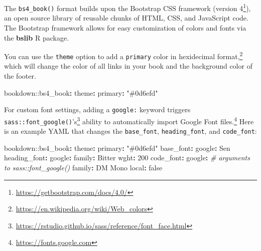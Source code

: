 \documentclass[
  12pt,
]{krantz}
\newenvironment{Shaded}{\begin{snugshade}}{\end{snugshade}}
\newcommand{\AttributeTok}[1]{\textcolor[rgb]{0.77,0.63,0.00}{#1}}
\newcommand{\CharTok}[1]{\textcolor[rgb]{0.31,0.60,0.02}{#1}}
\newcommand{\CommentTok}[1]{\textcolor[rgb]{0.56,0.35,0.01}{\textit{#1}}}
\newcommand{\DecValTok}[1]{\textcolor[rgb]{0.00,0.00,0.81}{#1}}
\newcommand{\FunctionTok}[1]{\textcolor[rgb]{0.00,0.00,0.00}{#1}}
\newcommand{\KeywordTok}[1]{\textcolor[rgb]{0.13,0.29,0.53}{\textbf{#1}}}
\newcommand{\StringTok}[1]{\textcolor[rgb]{0.31,0.60,0.02}{#1}}
\renewcommand{\href}[2]{#2\footnote{\url{#1}}}
\theoremstyle{definition}
\theoremstyle{definition}
\theoremstyle{definition}
\theoremstyle{definition}
\theoremstyle{remark}
\begin{document}
The \texttt{bs4\_book()} format builds upon the Bootstrap CSS framework (\href{https://getbootstrap.com/docs/4.0/}{version 4}), an open source library of reusable chunks of HTML, CSS, and JavaScript code. The Bootstrap framework allows for easy customization of colors and fonts via the \textbf{bslib} R package.

You can use the \texttt{theme} option to add a \texttt{primary} color in \href{https://en.wikipedia.org/wiki/Web_colors}{hexidecimal format,} which will change the color of all links in your book and the background color of the footer.

\begin{Shaded}
\begin{Highlighting}[]
\AttributeTok{bookdown:}\FunctionTok{:bs4\_book}\KeywordTok{:}
\AttributeTok{  }\FunctionTok{theme}\KeywordTok{:}
\AttributeTok{    }\FunctionTok{primary}\KeywordTok{:}\AttributeTok{ }\StringTok{"\#0d6efd"}\AttributeTok{   }
\end{Highlighting}
\end{Shaded}

For custom font settings, adding a \texttt{google:} keyword triggers \href{https://rstudio.github.io/sass/reference/font_face.html}{\texttt{sass::font\_google()}'s} ability to automatically import \href{https://fonts.google.com}{Google Font files.} Here is an example YAML that changes the \texttt{base\_font}, \texttt{heading\_font}, and \texttt{code\_font}:

\begin{Shaded}
\begin{Highlighting}[]
\AttributeTok{bookdown:}\FunctionTok{:bs4\_book}\KeywordTok{:}
\AttributeTok{  }\FunctionTok{theme}\KeywordTok{:}
\AttributeTok{    }\FunctionTok{primary}\KeywordTok{:}\AttributeTok{ }\StringTok{"\#0d6efd"}\AttributeTok{   }
\AttributeTok{    }\FunctionTok{base\_font}\KeywordTok{:}\AttributeTok{ }
\AttributeTok{      }\FunctionTok{google}\KeywordTok{:}\AttributeTok{ Sen}
\AttributeTok{    }\FunctionTok{heading\_font}\KeywordTok{:}
\AttributeTok{      }\FunctionTok{google}\KeywordTok{:}
\AttributeTok{        }\FunctionTok{family}\KeywordTok{:}\AttributeTok{ Bitter}
\AttributeTok{        }\FunctionTok{wght}\KeywordTok{:}\AttributeTok{ }\DecValTok{200}
\AttributeTok{    }\FunctionTok{code\_font}\KeywordTok{:}
\AttributeTok{      }\FunctionTok{google}\KeywordTok{:}\AttributeTok{ }
\CommentTok{        \# arguments to sass::font\_google() }
\AttributeTok{        }\FunctionTok{family}\KeywordTok{:}\AttributeTok{ DM Mono}
\AttributeTok{        }\FunctionTok{local}\KeywordTok{:}\AttributeTok{ }\CharTok{false}
\end{Highlighting}
\end{Shaded}
\end{document}

